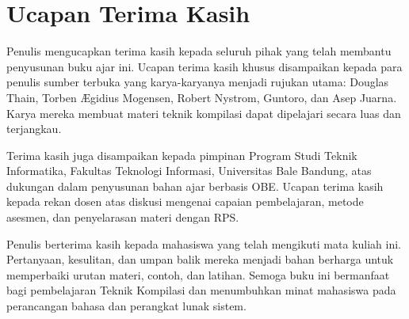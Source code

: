 \chapter*{Ucapan Terima Kasih}

Penulis mengucapkan terima kasih kepada seluruh pihak yang telah
membantu penyusunan buku ajar ini. Ucapan terima kasih khusus
disampaikan kepada para penulis sumber terbuka yang karya-karyanya
menjadi rujukan utama: Douglas Thain, Torben \AE{}gidius Mogensen,
Robert Nystrom, Guntoro, dan Asep Juarna. Karya mereka membuat materi
teknik kompilasi dapat dipelajari secara luas dan terjangkau.

Terima kasih juga disampaikan kepada pimpinan Program Studi Teknik
Informatika, Fakultas Teknologi Informasi, Universitas Bale Bandung,
atas dukungan dalam penyusunan bahan ajar berbasis OBE. Ucapan terima
kasih kepada rekan dosen atas diskusi mengenai capaian pembelajaran,
metode asesmen, dan penyelarasan materi dengan RPS.

Penulis berterima kasih kepada mahasiswa yang telah mengikuti mata
kuliah ini. Pertanyaan, kesulitan, dan umpan balik mereka menjadi
bahan berharga untuk memperbaiki urutan materi, contoh, dan latihan.
Semoga buku ini bermanfaat bagi pembelajaran Teknik Kompilasi dan
menumbuhkan minat mahasiswa pada perancangan bahasa dan perangkat
lunak sistem.
